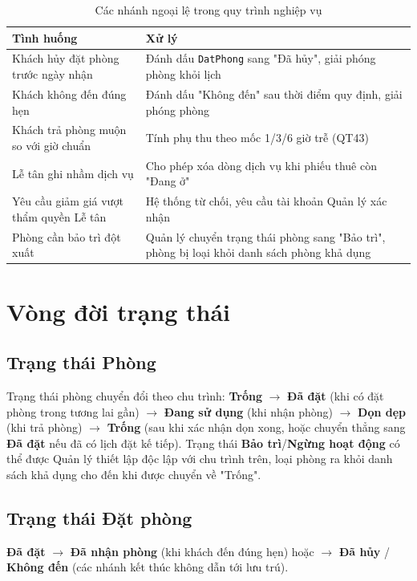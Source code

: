 \documentclass[14pt]{report}
\begin{document}
\begin{table}[H]
\centering
\caption{Các nhánh ngoại lệ trong quy trình nghiệp vụ}
\label{tab:ngoaile}
\begin{tabularx}{\textwidth}{|X|X|}
\hline
\textbf{Tình huống} & \textbf{Xử lý} \\\hline
Khách hủy đặt phòng trước ngày nhận & Đánh dấu \texttt{DatPhong} sang "Đã hủy", giải phóng phòng khỏi lịch \\\hline
Khách không đến đúng hẹn & Đánh dấu "Không đến" sau thời điểm quy định, giải phóng phòng \\\hline
Khách trả phòng muộn so với giờ chuẩn & Tính phụ thu theo mốc 1/3/6 giờ trễ (QT43) \\\hline
Lễ tân ghi nhầm dịch vụ & Cho phép xóa dòng dịch vụ khi phiếu thuê còn "Đang ở" \\\hline
Yêu cầu giảm giá vượt thẩm quyền Lễ tân & Hệ thống từ chối, yêu cầu tài khoản Quản lý xác nhận \\\hline
Phòng cần bảo trì đột xuất & Quản lý chuyển trạng thái phòng sang "Bảo trì", phòng bị loại khỏi danh sách phòng khả dụng \\\hline
\end{tabularx}
\end{table}

\section{Vòng đời trạng thái}

\subsection{Trạng thái Phòng}

Trạng thái phòng chuyển đổi theo chu trình: \textbf{Trống} $\to$ \textbf{Đã đặt} (khi có đặt phòng trong tương lai gần) $\to$ \textbf{Đang sử dụng} (khi nhận phòng) $\to$ \textbf{Dọn dẹp} (khi trả phòng) $\to$ \textbf{Trống} (sau khi xác nhận dọn xong, hoặc chuyển thẳng sang \textbf{Đã đặt} nếu đã có lịch đặt kế tiếp). Trạng thái \textbf{Bảo trì}/\textbf{Ngừng hoạt động} có thể được Quản lý thiết lập độc lập với chu trình trên, loại phòng ra khỏi danh sách khả dụng cho đến khi được chuyển về "Trống".

\subsection{Trạng thái Đặt phòng}

\textbf{Đã đặt} $\to$ \textbf{Đã nhận phòng} (khi khách đến đúng hẹn) hoặc $\to$ \textbf{Đã hủy} / \textbf{Không đến} (các nhánh kết thúc không dẫn tới lưu trú).
\end{document}
